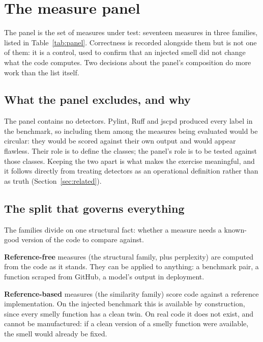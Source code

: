 \documentclass[10pt,a4paper,twocolumn]{article}
\begin{document}
\section{The measure panel}
\label{sec:panel}

The panel is the set of measures under test: seventeen measures in three
families, listed in Table~\ref{tab:panel}. Correctness is recorded alongside them
but is not one of them: it is a control, used to confirm that an injected
smell did not change what the code computes. Two decisions about the panel's
composition do more work than the list itself.

\subsection{What the panel excludes, and why}

The panel contains no detectors. Pylint, Ruff and jscpd produced every label in
the benchmark, so including them among the measures being evaluated would be
circular: they would be scored against their own output and would appear
flawless. Their role is to define the classes; the panel's role is to be tested
against those classes. Keeping the two apart is what makes the exercise
meaningful, and it follows directly from treating detectors as an operational
definition rather than as truth (Section~\ref{sec:related}).

\subsection{The split that governs everything}

The families divide on one structural fact: whether a measure needs a known-good
version of the code to compare against.

\textbf{Reference-free} measures (the structural family, plus perplexity) are
computed from the code as it stands. They can be applied to anything: a
benchmark pair, a function scraped from GitHub, a model's output in deployment.

\textbf{Reference-based} measures (the similarity family) score code against a
reference implementation. On the injected benchmark this is available by
construction, since every smelly function has a clean twin. On real code it does
not exist, and cannot be manufactured: if a clean version of a smelly function
were available, the smell would already be fixed.
\end{document}
